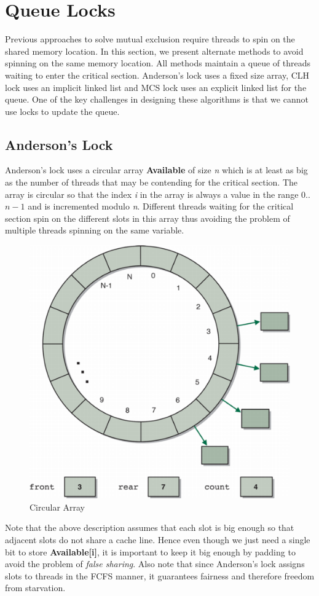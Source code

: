 \documentclass[twoside]{article}
\begin{document}
\section{Queue Locks}
Previous approaches to solve mutual exclusion require threads to spin on the shared memory location. In this section, we present alternate methods to avoid spinning on the same memory location. All methods maintain a queue of threads waiting to enter the critical section. Anderson's lock uses a fixed size array, CLH lock uses an implicit linked list and MCS lock uses an explicit linked list for the queue. One of the key challenges in designing these algorithms is that we cannot use locks to update the queue.

\subsection{Anderson's Lock}
Anderson's lock uses a circular array \textbf{Available} of size \emph{n} which is at least as big as the number of threads that may be contending for the critical section. The array is circular so that the index \emph{i} in the array is always a value in the range 0..$n-1$ and is incremented modulo \emph{n}. Different threads waiting for the critical section spin on the different slots in this array thus avoiding the problem of multiple threads spinning on the same variable. 

\begin{figure}[ht]
  \centering
  \includegraphics[height=0.38\textheight,width=0.5\linewidth]{./CircularArray.png} 
  \caption{Circular Array}
  \label{fig:ql}
\end{figure}

Note that the above description assumes that each slot is big enough so that adjacent slots do not share a cache line. Hence even though we just need a single bit to store \textbf{Available[i]}, it is important to keep it big enough by padding to avoid the problem of \textit{false sharing}. Also note that since Anderson's lock assigns slots to threads in the FCFS manner, it guarantees fairness and therefore freedom from starvation.
\end{document}
